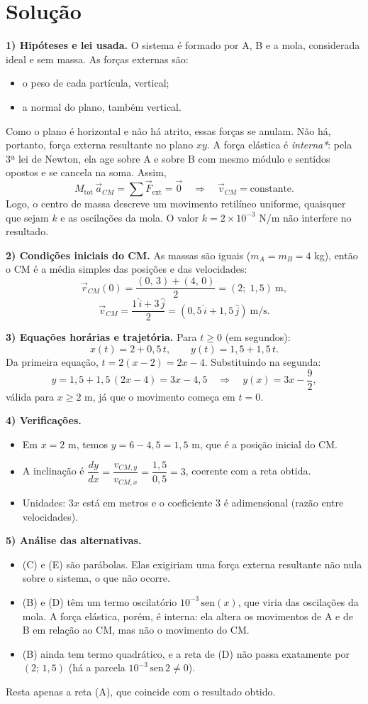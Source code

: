 \documentclass{article}%
\begin{document}
\section*{Solução}

\textbf{1) Hipóteses e lei usada.} O sistema é formado por A, B e a mola, considerada ideal e sem massa. As forças externas são:
\begin{itemize}
\item o peso de cada partícula, vertical;
\item a normal do plano, também vertical.
\end{itemize}
Como o plano é horizontal e não há atrito, essas forças se anulam. Não há, portanto, força externa resultante no plano $xy$. A força elástica é \emph{interna*}: pela 3ª lei de Newton, ela age sobre A e sobre B com mesmo módulo e sentidos opostos e se cancela na soma. Assim,
\[
M_{\text{tot}}\,\vec a_{CM}=\sum \vec F_{\text{ext}}=\vec 0 \quad\Longrightarrow\quad \vec v_{CM}=\text{constante}.
\]
Logo, o centro de massa descreve um movimento retilíneo uniforme, quaisquer que sejam $k$ e as oscilações da mola. O valor $k=2\times10^{-3}$ N/m não interfere no resultado.

\textbf{2) Condições iniciais do CM.} As massas são iguais ($m_A=m_B=4$ kg), então o CM é a média simples das posições e das velocidades:
\[
\vec r_{CM}(0)=\frac{(0,\,3)+(4,\,0)}{2}=(2;\;1{,}5)\ \text{m},
\]
\[
\vec v_{CM}=\frac{1\,\hat i+3\,\hat j}{2}=\left(0{,}5\,\hat i+1{,}5\,\hat j\right)\ \text{m/s}.
\]

\textbf{3) Equações horárias e trajetória.} Para $t\geq 0$ (em segundos):
\[
x(t)=2+0{,}5\,t,\qquad y(t)=1{,}5+1{,}5\,t .
\]
Da primeira equação, $t=2(x-2)=2x-4$. Substituindo na segunda:
\[
y=1{,}5+1{,}5\,(2x-4)=3x-4{,}5
\quad\Longrightarrow\quad
y(x)=3x-\frac{9}{2},
\]
válida para $x\geq 2$ m, já que o movimento começa em $t=0$.

\textbf{4) Verificações.}
\begin{itemize}
\item Em $x=2$ m, temos $y=6-4{,}5=1{,}5$ m, que é a posição inicial do CM.
\item A inclinação é $\dfrac{dy}{dx}=\dfrac{v_{CM,y}}{v_{CM,x}}=\dfrac{1{,}5}{0{,}5}=3$, coerente com a reta obtida.
\item Unidades: $3x$ está em metros e o coeficiente $3$ é adimensional (razão entre velocidades).
\end{itemize}

\textbf{5) Análise das alternativas.}
\begin{itemize}
\item (C) e (E) são parábolas. Elas exigiriam uma força externa resultante não nula sobre o sistema, o que não ocorre.
\item (B) e (D) têm um termo oscilatório $10^{-3}\,\text{sen}(x)$, que viria das oscilações da mola. A força elástica, porém, é interna: ela altera os movimentos de A e de B em relação ao CM, mas não o movimento do CM.
\item (B) ainda tem termo quadrático, e a reta de (D) não passa exatamente por $(2;\,1{,}5)$ (há a parcela $10^{-3}\,\text{sen}\,2\neq0$).
\end{itemize}
Resta apenas a reta (A), que coincide com o resultado obtido.
\end{document}
